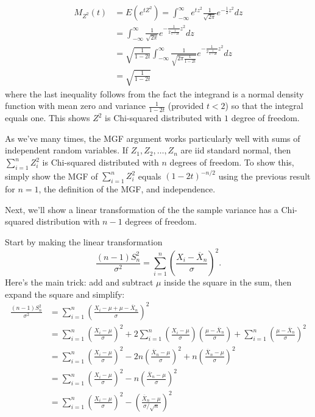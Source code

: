 \documentclass[
]{book}
\begin{document}
\begin{align*}
M_{Z^2}(t) &= E(e^{tZ^2}) = \int_{-\infty}^{\infty} e^{tz^2}\frac{1}{\sqrt{2\pi}}e^{-\tfrac12 z^2}dz\\
& = \int_{-\infty}^{\infty} \frac{1}{\sqrt{2\pi}} e^{-\frac{1}{2\frac{1}{1-2t}}z^2}dz\\
& = \sqrt{\frac{1}{1-2t}}\int_{-\infty}^{\infty} \frac{1}{\sqrt{2\pi\frac{1}{1-2t}}} e^{-\frac{1}{2\frac{1}{1-2t}}z^2}dz\\
& = \sqrt{\frac{1}{1-2t}}
\end{align*}
where the last inequality follows from the fact the integrand is a normal density function with mean zero and variance \(\frac{1}{1-2t}\) (provided \(t<2\)) so that the integral equals one. This shows \(Z^2\) is Chi-squared distributed with \(1\) degree of freedom.

As we've many times, the MGF argument works particularly well with sums of independent random variables. If \(Z_1, Z_2, \ldots, Z_n\) are iid standard normal, then \(\sum_{i=1}^n Z_i^2\) is Chi-squared distributed with \(n\) degrees of freedom. To show this, simply show the MGF of \(\sum_{i=1}^n Z_i^2\) equals \(\left(1-2t\right)^{-n/2}\) using the previous result for \(n=1\), the definition of the MGF, and independence.

Next, we'll show a linear transformation of the the sample variance has a Chi-squared distribution with \(n-1\) degrees of freedom.

Start by making the linear transformation
\[\frac{(n-1)S_n^2}{\sigma^2} = \sum_{i=1}^n \left(\frac{X_i - \overline X_n}{\sigma}\right)^2.\]
Here's the main trick: add and subtract \(\mu\) inside the square in the sum, then expand the square and simplify:
\begin{align*}
\frac{(n-1)S_n^2}{\sigma^2} &= \sum_{i=1}^n \left(\frac{X_i - \mu + \mu - \overline X_n}{\sigma}\right)^2\\
& = \sum_{i=1}^n \left(\frac{X_i - \mu}{\sigma}\right)^2 + 2\sum_{i=1}^n \left(\frac{X_i - \mu}{\sigma}\right)\left(\frac{\mu - \overline X_n}{\sigma}\right) + \sum_{i=1}^n \left(\frac{\mu - \overline X_n}{\sigma}\right)^2\\
& = \sum_{i=1}^n \left(\frac{X_i - \mu}{\sigma}\right)^2 - 2n\left(\frac{\overline X_n - \mu}{\sigma}\right)^2 + n\left(\frac{\overline X_n - \mu}{\sigma}\right)^2\\
& = \sum_{i=1}^n \left(\frac{X_i - \mu}{\sigma}\right)^2 - n\left(\frac{\overline X_n - \mu}{\sigma}\right)^2\\
& = \sum_{i=1}^n \left(\frac{X_i - \mu}{\sigma}\right)^2 - \left(\frac{\overline X_n - \mu}{\sigma/\sqrt{n}}\right)^2
\end{align*}
\end{document}
